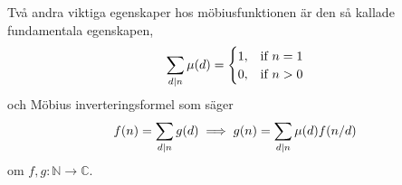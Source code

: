 Två andra viktiga egenskaper hos möbiusfunktionen är den så kallade fundamentala egenskapen,
\begin{equation*}
    \sum_{d \mid n} \mu(d) =
    \begin{cases}
        1, & \text{if}\ n = 1 \\
        0, & \text{if}\ n > 0
    \end{cases}
\end{equation*}
och Möbius inverteringsformel som säger
\begin{equation*}
    f(n) = \sum_{d \mid n} g(d) \implies g(n) = \sum_{d \mid n} \mu(d) f(n/d)
\end{equation*}
om \(f, g : \mathbb{N} \to \mathbb{C}\).


